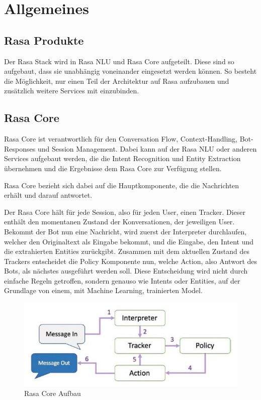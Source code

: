 \section{Allgemeines}

\subsection{Rasa Produkte}

Der Rasa Stack wird in Rasa NLU und Rasa Core aufgeteilt.
Diese sind so aufgebaut, dass sie unabhängig voneinander eingesetzt werden können.
So besteht die Möglichkeit, nur einen Teil der Architektur auf Rasa aufzubauen und zusätzlich weitere Services mit einzubinden.

\subsection{Rasa Core}

Rasa Core ist verantwortlich für den Conversation Flow, Context-Handling, Bot-Responses und Session Management.
Dabei kann auf der Rasa NLU oder anderen Services aufgebaut werden, die die Intent Recognition und Entity Extraction übernehmen und die Ergebnisse dem Rasa Core zur Verfügung stellen.\cite{rasaCore}

Rasa Core bezieht sich dabei auf die Hauptkomponente, die die Nachrichten erhält und darauf antwortet.\cite{rasaCore}

Der Rasa Core hält für jede Session, also für jeden User, einen Tracker.
Dieser enthält den momentanen Zustand der Konversationen, der jeweiligen User.
Bekommt der Bot nun eine Nachricht, wird zuerst der Interpreter durchlaufen, welcher den Originaltext als Eingabe bekommt, und die Eingabe, den Intent und die extrahierten Entities zurückgibt.
Zusammen mit dem aktuellen Zustand des Trackers entscheidet die Policy Komponente nun, welche Action, also Antwort des Bots, als nächstes ausgeführt werden soll.
Diese Entscheidung wird nicht durch einfache Regeln getroffen, sondern genauso wie Intents oder Entities, auf der Grundlage von einem, mit Machine Learning, trainierten Model.\cite{rasaCore, rasaCoreBook}

\begin{figure}
  \centering
  \includegraphics[scale=0.25]{pics/rasa-core}
  \caption{Rasa Core Aufbau~\cite{rasaCoreBook}}
  \label{fig:rasa_core}
\end{figure}

